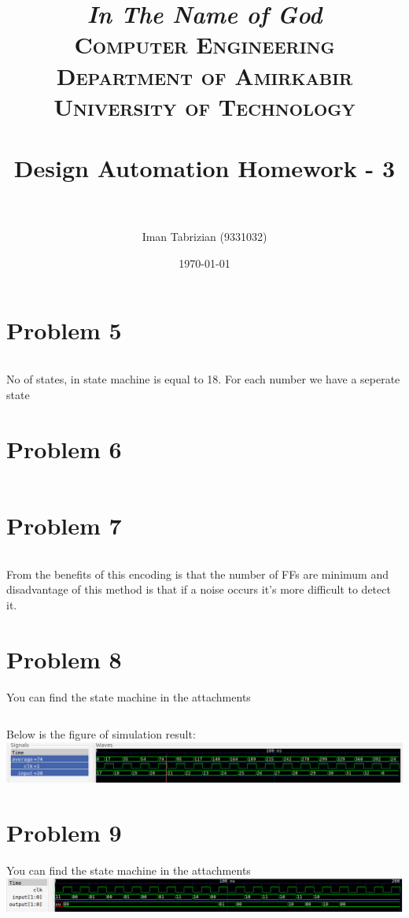 \documentclass[paper=a4, fontsize=11pt]{scrartcl} %
\title{
\normalfont \normalsize
\textit{In The Name of God} \\
\textsc{Computer Engineering Department of Amirkabir University of Technology} \\ [25pt]
\horrule{0.5pt} \\[0.4cm] %
\huge Design Automation Homework - 3 \\ %
\horrule{2pt} \\[0.5cm] %
}
\author{Iman Tabrizian (9331032)}
\date{\normalsize\today}
\numberwithin{equation}{section} %
\numberwithin{figure}{section} %
\numberwithin{table}{section} %
\begin{document}
\maketitle


\section{Problem 5}
\inputminted{vhdl}{q5/src/counter.vhd}
\par No of states, in state machine is equal to 18. For each number we have a
seperate state

\section{Problem 6}
\inputminted{vhdl}{q6/src/fsm.vhd}

\section{Problem 7}
\inputminted{vhdl}{q7/src/fsm.vhd}
\par From the benefits of this encoding is that the number of FFs are minimum
and disadvantage of this method is that if a noise occurs it's more difficult
to detect it.

\section{Problem 8}
\par You can find the state machine in the attachments
\inputminted{vhdl}{q8/src/averager.vhd}
\par Below is the figure of simulation result:
\center\includegraphics[scale=0.4]{q8.png}

\section{Problem 9}
\par You can find the state machine in the attachments
\center\includegraphics[scale=0.4]{q9.png}
\inputminted{vhdl}{q9/src/sequence_detector.vhd}
\end{document}
